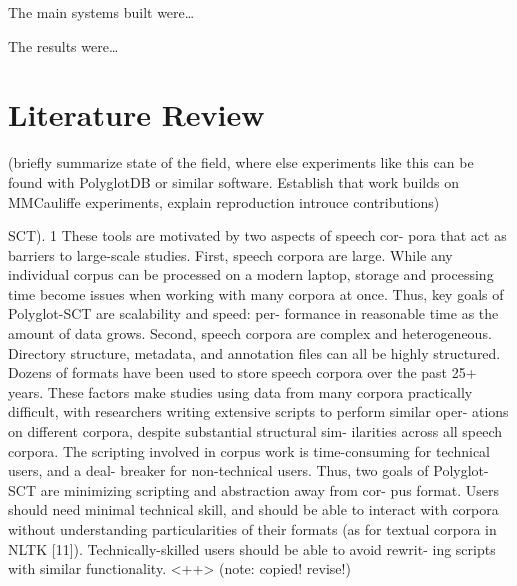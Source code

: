 \documentclass[11pt]{article}
\begin{document}
The main systems built were\ldots {}

The results were\ldots{}

\section{Literature Review}

(briefly summarize state of the field, where else experiments like this can be found with PolyglotDB or similar software. Establish that work builds on MMCauliffe experiments, explain reproduction introuce contributions)

SCT). 1 These tools are motivated by two aspects of speech cor-
pora that act as barriers to large-scale studies.
First, speech corpora are large. While any individual corpus
can be processed on a modern laptop, storage and processing
time become issues when working with many corpora at once.
Thus, key goals of Polyglot-SCT are scalability and speed: per-
formance in reasonable time as the amount of data grows.
Second, speech corpora are complex and heterogeneous.
Directory structure, metadata, and annotation files can all be
highly structured. Dozens of formats have been used to store
speech corpora over the past 25+ years. These factors make
studies using data from many corpora practically difficult, with
researchers writing extensive scripts to perform similar oper-
ations on different corpora, despite substantial structural sim-
ilarities across all speech corpora. The scripting involved in
corpus work is time-consuming for technical users, and a deal-
breaker for non-technical users. Thus, two goals of Polyglot-
SCT are minimizing scripting and abstraction away from cor-
pus format. Users should need minimal technical skill, and
should be able to interact with corpora without understanding
particularities of their formats (as for textual corpora in NLTK
[11]). Technically-skilled users should be able to avoid rewrit-
ing scripts with similar functionality.
<++> (note: copied! revise!)
\end{document}
